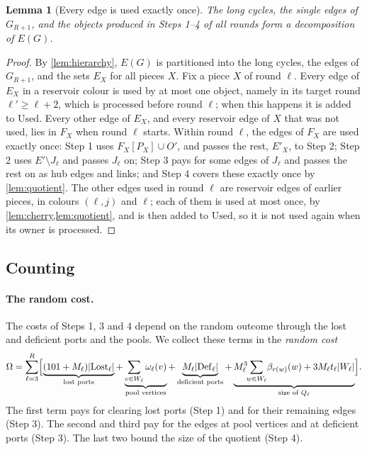 \documentclass[11pt]{article}
\newtheorem{lemma}[theorem]{Lemma}
\theoremstyle{definition}
\theoremstyle{remark}
\numberwithin{equation}{section}
\numberwithin{figure}{section}
\numberwithin{table}{section}
\newcommand{\Lost}{\mathrm{Lost}}
\newcommand{\Def}{\mathrm{Def}}
\newcommand{\Used}{\mathrm{Used}}
\begin{document}
\begin{lemma}[Every edge is used exactly once]\label{lem:ledger}
The long cycles, the single edges of $G_{R+1}$, and the objects produced in
Steps 1--4 of all rounds form a decomposition of $E(G)$.
\end{lemma}

\begin{proof}
By \cref{lem:hierarchy}, $E(G)$ is partitioned into the long cycles, the edges
of $G_{R+1}$, and the sets $E_X$ for all pieces $X$. Fix a piece $X$ of round
$\ell$. Every edge of $E_X$ in a reservoir colour is used by at most one object,
namely in its target round $\ell'\ge\ell+2$, which is processed before round
$\ell$; when this happens it is added to $\Used$. Every other edge of $E_X$, and
every reservoir edge of $X$ that was not used, lies in $F_X$ when round $\ell$
starts. Within round $\ell$, the edges of $F_X$ are used exactly once: Step 1
uses $F_X[P_X]\cup O'$, and passes the rest, $E'_X$, to Step 2; Step 2 uses
$E'\setminus J_\ell$ and passes $J_\ell$ on; Step 3 pays for some edges of
$J_\ell$ and passes the rest on as hub edges and links; and Step 4 covers these
exactly once by \cref{lem:quotient}. The other edges used in round $\ell$ are
reservoir edges of earlier pieces, in colours $(\ell,j)$ and $\ell$; each of
them is used at most once, by \cref{lem:cherry,lem:quotient}, and is then added
to $\Used$, so it is not used again when its owner is processed.
\end{proof}

\subsection{Counting}\label{sec:count}

\paragraph{The random cost.} The costs of Steps 1, 3 and 4 depend on the random
outcome through the lost and deficient ports and the pools. We collect these
terms in the \emph{random cost}
\[
\Omega=\sum_{\ell=3}^R\Bigl[\underbrace{(101+M_\ell)|\Lost_\ell|}_{\text{lost ports}}
+\underbrace{\sum_{v\in W_\ell}\omega_\ell(v)}_{\text{pool vertices}}
+\underbrace{M_\ell|\Def_\ell|}_{\text{deficient ports}}
+\underbrace{M_\ell^3\!\!\sum_{w\in W_\ell}\!\beta_{r(w)}(w)+3M_\ell t_\ell|W_\ell|}_{\text{size of }Q_\ell}\Bigr].
\]
The first term pays for clearing lost ports (Step 1) and for their remaining
edges (Step 3). The second and third pay for the edges at pool vertices and at
deficient ports (Step 3). The last two bound the size of the quotient
(Step 4).
\end{document}
